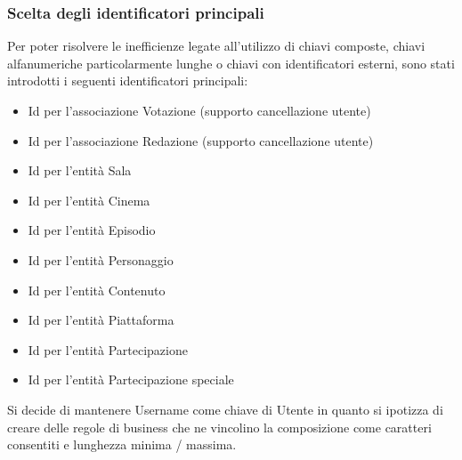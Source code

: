 \documentclass[a4paper]{article}
\begin{document}
\subsubsection{Scelta degli identificatori principali}
Per poter risolvere le inefficienze legate all'utilizzo di chiavi composte,
chiavi alfanumeriche particolarmente lunghe o chiavi con identificatori esterni,
sono stati introdotti i seguenti identificatori principali:
\begin{itemize}
  \item Id per l'associazione Votazione (supporto cancellazione utente)\\ 
  \item Id per l'associazione Redazione (supporto cancellazione utente)\\ 
  \item Id per l'entità Sala \\
  \item Id per l'entità Cinema \\
  \item Id per l'entità Episodio\\
  \item Id per l'entità Personaggio\\
  \item Id per l'entità Contenuto\\
  \item Id per l'entità Piattaforma\\
  \item Id per l'entità Partecipazione\\
  \item Id per l'entità Partecipazione speciale\\
\end{itemize}

Si decide di mantenere Username come chiave di Utente in quanto si ipotizza di creare delle regole di business
che ne vincolino la composizione come caratteri consentiti e lunghezza minima / massima.\\
\end{document}
